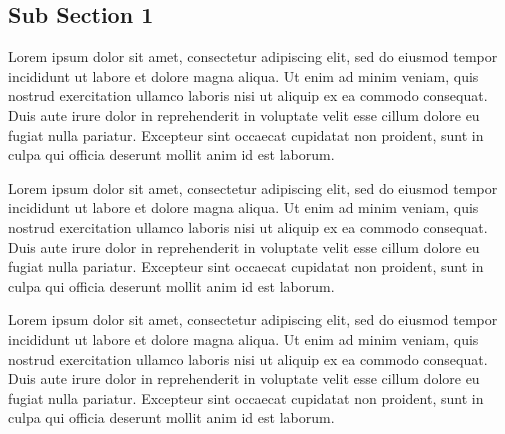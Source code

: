 \documentclass[oneside,12pt]{article}
\begin{document}
\subsection{Sub Section 1}

Lorem ipsum dolor sit amet, consectetur adipiscing elit, sed do eiusmod tempor incididunt ut labore et dolore magna aliqua. Ut enim ad minim veniam, quis nostrud exercitation ullamco laboris nisi ut aliquip ex ea commodo consequat. Duis aute irure dolor in reprehenderit in voluptate velit esse cillum dolore eu fugiat nulla pariatur. Excepteur sint occaecat cupidatat non proident, sunt in culpa qui officia deserunt mollit anim id est laborum.


Lorem ipsum dolor sit amet, consectetur adipiscing elit, sed do eiusmod tempor incididunt ut labore et dolore magna aliqua. Ut enim ad minim veniam, quis nostrud exercitation ullamco laboris nisi ut aliquip ex ea commodo consequat. Duis aute irure dolor in reprehenderit in voluptate velit esse cillum dolore eu fugiat nulla pariatur. Excepteur sint occaecat cupidatat non proident, sunt in culpa qui officia deserunt mollit anim id est laborum.

Lorem ipsum dolor sit amet, consectetur adipiscing elit, sed do eiusmod tempor incididunt ut labore et dolore magna aliqua. Ut enim ad minim veniam, quis nostrud exercitation ullamco laboris nisi ut aliquip ex ea commodo consequat. Duis aute irure dolor in reprehenderit in voluptate velit esse cillum dolore eu fugiat nulla pariatur. Excepteur sint occaecat cupidatat non proident, sunt in culpa qui officia deserunt mollit anim id est laborum.
\end{document}
